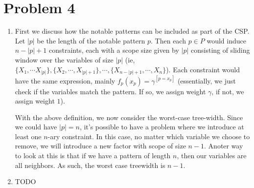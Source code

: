 \documentclass[12pt]{article}
\begin{document}
\section*{Problem 4}

\begin{enumerate}[label=(\alph*)]
  \item First we discuss how the notable patterns can be included as part of the CSP. Let $|p|$ be the length of the notable pattern $p$. Then each $p \in P$ would induce $n - |p| + 1$ constraints, each with a scope size given by $|p|$ consisting of sliding window over the variables of size $|p|$ (ie, $\{X_1, \cdots X_{|p|}\}, \{X_{2},\cdots,X_{|p| + 1} \}, \cdots, \{X_{n-|p|+1},\cdots, X_n \}$). Each constraint would have the same expression, mainly $f_p(x_p) = \gamma^{[p= x_p]}$ (essentially, we just check if the variables match the pattern. If so, we assign weight $\gamma$, if not, we assign weight $1$).

  With the above definition, we now consider the worst-case tree-width. Since we could have $|p| = n$, it's possible to have a problem where we introduce at least one $n$-ary constraint. In this case, no matter which variable we choose to remove, we will introduce a new factor with scope of size $n - 1$. Anoter way to look at this is that if we have a pattern of length $n$, then our variables are all neighbors. As such, the worst case treewidth is $n-1$.
  \item TODO
\end{enumerate}
\end{document}
